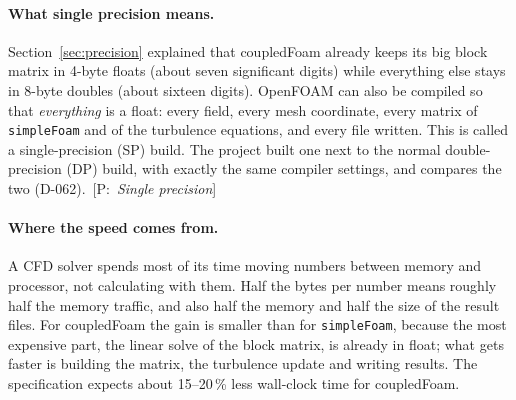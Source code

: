 \documentclass[11pt,a4paper]{article}
\newcommand{\code}[1]{\texttt{#1}}
\newcommand{\pro}[1]{\ {\small[P:~\textit{#1}]}}
\begin{document}
\paragraph{What single precision means.} Section~\ref{sec:precision}
explained that coupledFoam already keeps its big block matrix in 4-byte
floats (about seven significant digits) while everything else stays in
8-byte doubles (about sixteen digits). OpenFOAM can also be compiled so
that \emph{everything} is a float: every field, every mesh coordinate, every
matrix of \code{simpleFoam} and of the turbulence equations, and every file
written. This is called a single-precision (SP) build. The project built
one next to the normal double-precision (DP) build, with exactly the same
compiler settings, and compares the two (D-062).\pro{Single precision}

\paragraph{Where the speed comes from.} A CFD solver spends most of its
time moving numbers between memory and processor, not calculating with
them. Half the bytes per number means roughly half the memory traffic, and
also half the memory and half the size of the result files. For
coupledFoam the gain is smaller than for \code{simpleFoam}, because the
most expensive part, the linear solve of the block matrix, is already in
float; what gets faster is building the matrix, the turbulence update and
writing results. The specification expects about 15--20\,\% less
wall-clock time for coupledFoam.
\end{document}
